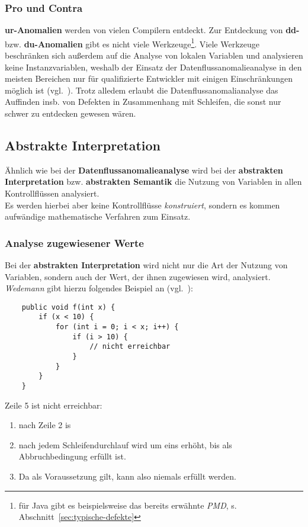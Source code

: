 \subsubsection*{Pro und Contra}
\textbf{ur-Anomalien} werden von vielen Compilern entdeckt.
Zur Entdeckung von \textbf{dd-} bzw. \textbf{du-Anomalien} gibt es nicht viele Werkzeuge\footnote{
für Java gibt es beispielsweise das bereits erwähnte \textit{PMD}, s. Abschnitt~\ref{sec:typische-defekte}
}.
Viele Werkzeuge beschränken sich außerdem auf die Analyse von lokalen Variablen und analysieren keine Instanzvariablen, weshalb der Einsatz der Datenflussanomalieanalyse in den meisten Bereichen nur für qualifizierte Entwickler mit einigen Einschränkungen möglich ist (vgl.~\cite[36]{Wed09c}).
Trotz alledem erlaubt die Datenflussanomalianalyse das Auffinden insb. von Defekten in Zusammenhang mit Schleifen, die sonst nur schwer zu entdecken gewesen wären.

\subsection{Abstrakte Interpretation}
Ähnlich wie bei der \textbf{Datenflussanomalieanalyse} wird bei der \textbf{abstrakten Interpretation} bzw. \textbf{abstrakten Semantik} die Nutzung von Variablen in allen Kontrollflüssen analysiert.\\
Es werden hierbei aber keine Kontrollflüsse \textit{konstruiert}, sondern es kommen aufwändige mathematische Verfahren zum Einsatz.

\subsubsection*{Analyse zugewiesener Werte}
Bei der \textbf{abstrakten Interpretation} wird nicht nur die Art der Nutzung von Variablen, sondern auch der Wert, der ihnen zugewiesen wird, analysiert.\\
\textit{Wedemann} gibt hierzu folgendes Beispiel an (vgl.~\cite[36]{Wed09c}):

\begin{verbatim}
    public void f(int x) {
        if (x < 10) {
            for (int i = 0; i < x; i++) {
                if (i > 10) {
                    // nicht erreichbar
                }
            }
        }
    }
\end{verbatim}

\noindent
Zeile 5 ist nicht erreichbar:

\begin{enumerate}
    \item nach Zeile 2 is 
    \item nach jedem Schleifendurchlauf wird  um eins erhöht, bis  als Abbruchbedingung erfüllt ist.
    \item[] Da  als Voraussetzung gilt, kann also  niemals erfüllt werden.
\end{enumerate}

